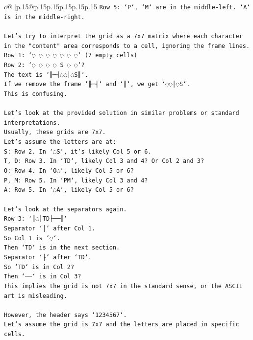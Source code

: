 \documentclass{article}
\begin{document}
{\begin{supertabular}{c@{$\;$}|p{.15\linewidth}@{}p{.15\linewidth}p{.15\linewidth}p{.15\linewidth}p{.15\linewidth}p{.15\linewidth}}
{{{\texttt{Row 5: `P`, `M` are in the middle{-}left. `A` is in the middle{-}right.} \\
\\ 
\texttt{Let's try to interpret the grid as a 7x7 matrix where each character in the "content" area corresponds to a cell, ignoring the frame lines.} \\
\texttt{Row 1: `◌ ◌ ◌ ◌ ◌ ◌ ◌` (7 empty cells)} \\
\texttt{Row 2: `◌ ◌ ◌ ◌ S ◌ ◌`?} \\
\texttt{The text is `╟─┤◌◌│◌S║`.} \\
\texttt{If we remove the frame `╟─┤` and `║`, we get `◌◌│◌S`.} \\
\texttt{This is confusing.} \\
\\ 
\texttt{Let's look at the provided solution in similar problems or standard interpretations.} \\
\texttt{Usually, these grids are 7x7.} \\
\texttt{Let's assume the letters are at:} \\
\texttt{S: Row 2. In `◌S`, it's likely Col 5 or 6.} \\
\texttt{T, D: Row 3. In `TD`, likely Col 3 and 4? Or Col 2 and 3?} \\
\texttt{O: Row 4. In `O◌`, likely Col 5 or 6?} \\
\texttt{P, M: Row 5. In `PM`, likely Col 3 and 4?} \\
\texttt{A: Row 5. In `◌A`, likely Col 5 or 6?} \\
\\ 
\texttt{Let's look at the separators again.} \\
\texttt{Row 3: `║◌│TD├──╢`} \\
\texttt{Separator `│` after Col 1.} \\
\texttt{So Col 1 is `◌`.} \\
\texttt{Then `TD` is in the next section.} \\
\texttt{Separator `├` after `TD`.} \\
\texttt{So `TD` is in Col 2?} \\
\texttt{Then `──` is in Col 3?} \\
\texttt{This implies the grid is not 7x7 in the standard sense, or the ASCII art is misleading.} \\
\\ 
\texttt{However, the header says `1234567`.} \\
\texttt{Let's assume the grid is 7x7 and the letters are placed in specific cells.} \\
}}}
\end{supertabular}}
\end{document}

